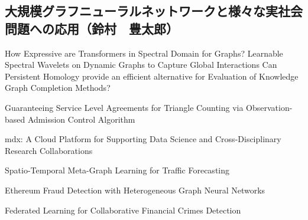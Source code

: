 
\subsection{大規模グラフニューラルネットワークと様々な実社会問題への応用（鈴村　豊太郎）}


How Expressive are Transformers in Spectral Domain for Graphs? \cite{feta}
Learnable Spectral Wavelets on Dynamic Graphs to Capture Global Interactions \cite{deft}
Can Persistent Homology provide an efficient alternative for Evaluation of Knowledge Graph Completion Methods? \cite{kg-kp}

Guaranteeing Service Level Agreements for Triangle Counting via Observation-based Admission Control Algorithm \cite{gqsm}

mdx: A Cloud Platform for Supporting Data Science and Cross-Disciplinary Research Collaborations \cite{mdx}

Spatio-Temporal Meta-Graph Learning for Traffic Forecasting \cite{megacrn}

Ethereum Fraud Detection with Heterogeneous Graph Neural Networks \cite{eth-gnn}

Federated Learning for Collaborative Financial Crimes Detection \cite{fl-book}




